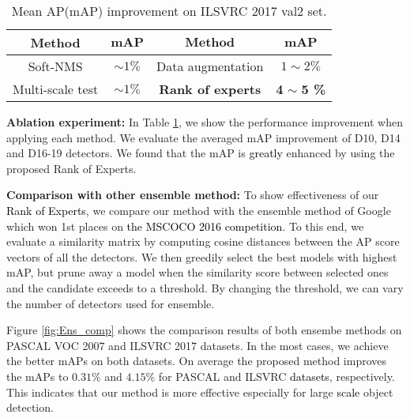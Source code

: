 \documentclass[10pt,twocolumn,letterpaper]{article}
\newcommand{\RV}{\textcolor{black}}
\begin{document}
\begin{table}[tbp]
\caption{Mean AP(mAP) improvement on ILSVRC 2017 val2 set.}  
\vspace{-5pt}
{\footnotesize
\begin{center}
\renewcommand{\tabcolsep}{0.7mm}
\begin{tabular}{cc|cc}
\hline \hline
\textbf{Method} & $\textbf{mAP}$ & $\textbf{Method}$& $\textbf{mAP}$ \\
\hline 
Soft-NMS \cite{BodlaSCD_CORR17} & $\sim 1\%$ &Data augmentation  & $1 \sim 2 \%$ \\
Multi-scale test & $\sim 1\%$ &\cellcolor[gray]{0.875}\color{black}\textbf{Rank of experts} & \cellcolor[gray]{0.875}\color{black}\textbf{4} \textbf{$\sim$} \textbf{5 \%} \\
\hline \hline 
\end{tabular}
\end{center}}
\vspace{-10pt}
\label{TABLE:ILSVRC_Ab}
\end{table}

\textbf{Ablation experiment:}
In Table \ref{TABLE:ILSVRC_Ab}, we show the performance improvement when applying each method. We evaluate the averaged mAP improvement of D10, D14 and D16-19 detectors. We found that the mAP is \RV{greatly} enhanced  by using the proposed Rank of Experts.




\textbf{Comparison with other ensemble method:}
To show effectiveness of our \RV{Rank of Experts}, we compare our method with the ensemble method of Google \cite{HuangRSZKFFWSG_Corr16} which won 1st places on  \RV{the MSCOCO 2016 competition}. To this end, we evaluate a similarity matrix by computing cosine distances between the AP score vectors of all the detectors. We then greedily select the best models with highest mAP, but prune away a model when the similarity score between selected ones and the candidate exceeds to a threshold. By changing the threshold, we can vary the number of detectors used for ensemble.
     

Figure \ref{fig:Ens_comp} shows the comparison results of both ensembe methods on PASCAL VOC 2007 and ILSVRC 2017 datasets. In the most cases, we achieve the better mAPs on both datasets. On average the proposed method improves the mAPs to $0.31\%$ and $4.15\%$ for PASCAL and ILSVRC \RV{datasets}, respectively. This indicates that our method is more effective especially for large \RV{scale} object detection. 
\end{document}
